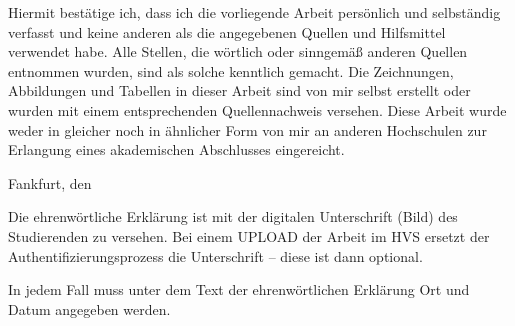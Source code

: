 %
%


Hiermit bestätige ich, dass ich die vorliegende Arbeit persönlich und selbständig verfasst und keine anderen als die angegebenen Quellen und Hilfsmittel verwendet habe. Alle Stellen, die wörtlich oder sinngemäß anderen Quellen entnommen wurden, sind als solche kenntlich gemacht. Die Zeichnungen, Abbildungen und Tabellen in dieser Arbeit sind von mir selbst erstellt oder wurden mit einem entsprechenden Quellennachweis versehen. Diese Arbeit wurde weder in gleicher noch in ähnlicher Form von mir an anderen Hochschulen zur Erlangung eines akademischen Abschlusses eingereicht.

\vspace{2cm}
Fankfurt, den \dotfill

\hspace{10cm} {\footnotesize \fullname}

\vspace{2cm}

Die ehrenwörtliche Erklärung ist mit der digitalen Unterschrift (Bild) des Studierenden zu versehen. Bei einem UPLOAD der Arbeit im HVS ersetzt der Authentifizierungsprozess die Unterschrift – diese ist dann optional.

In jedem Fall muss unter dem Text der ehrenwörtlichen Erklärung Ort und Datum angegeben werden.
